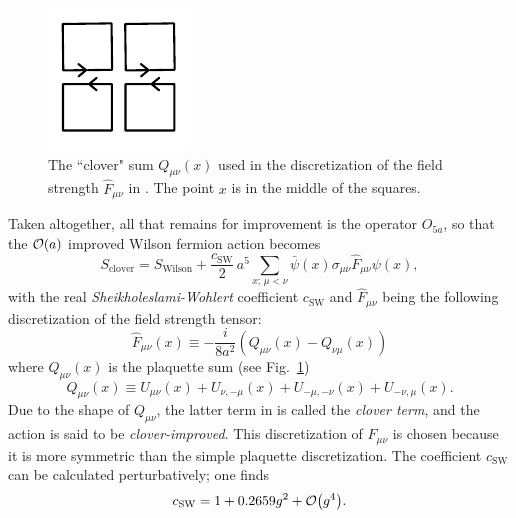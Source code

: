 \begin{figure}
  \centering
  \includegraphics[width=0.5\linewidth]{figs/clover.pdf}
  \caption{The ``clover" sum $Q_{\mu\nu}(x)$ used in the discretization of the
           field strength $\hat{F}_{\mu\nu}$ in .
           The point $x$ is in the middle of the squares.}
           
  \label{fig:clover}
\end{figure}

Taken altogether, all that remains for improvement is the operator $O_{5a}$,
so that the $\order{a}$ improved Wilson fermion action becomes
\begin{equation}\label{eq:cloverAction}
  S_\text{clover}=S_\text{Wilson}+\frac{c_\text{SW}}{2}
               \,a^5\sum_{x;\,\mu<\nu}\bar{\psi}(x)
                  \sigma_{\mu\nu}\hat{F}_{\mu\nu}\psi(x),
\end{equation}
with the real {\it Sheikholeslami-Wohlert} coefficient $c_\text{SW}$
\cite{sheikholeslami_improved_1985} and $\hat{F}_{\mu\nu}$ being the
following discretization of the field strength tensor:
\begin{equation}\label{eq:cloverField}
  \hat{F}_{\mu\nu}(x)\equiv
    -\frac{i}{8a^2}\left(Q_{\mu\nu}(x)-Q_{\nu\mu}(x)\right)
\end{equation}
where $Q_{\mu\nu}(x)$ is the plaquette sum (see Fig.~\ref{fig:clover})
\begin{equation}
  Q_{\mu\nu}(x)\equiv U_{\mu\nu}(x)+U_{\nu,-\mu}(x)
                 +U_{-\mu,-\nu}(x)+U_{-\nu,\mu}(x).
\end{equation}
Due to the shape of $Q_{\mu\nu}$, the latter term in 
 is called the {\it clover term}, and the
action is said to be {\it clover-improved}.
This discretization of $F_{\mu\nu}$ is chosen because it is more
symmetric than the simple plaquette discretization.
The coefficient $c_\text{SW}$ can be calculated perturbatively; one finds
\cite{sheikholeslami_improved_1985}
\begin{equation}\label{eq:SWcoeff}
  c_\text{SW}=1+0.2659 g^2+\order{g^4}.
\end{equation} 

